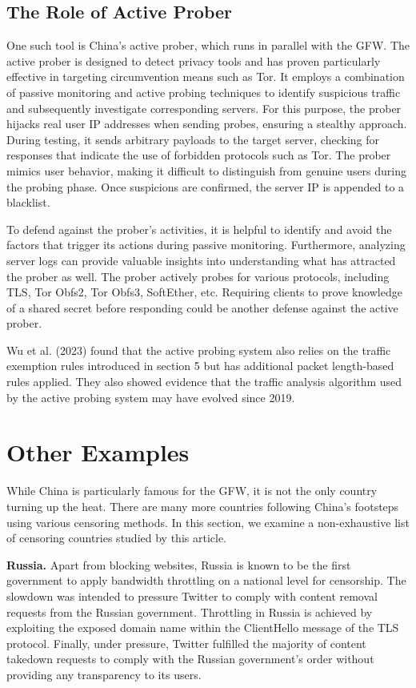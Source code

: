 \subsection{The Role of Active Prober}
One such tool is China's active prober, which runs in parallel with the GFW. The active prober is designed to detect privacy tools and has proven particularly effective in targeting circumvention means such as Tor. It employs a combination of passive monitoring and active probing techniques to identify suspicious traffic and subsequently investigate corresponding servers. For this purpose, the prober hijacks real user IP addresses when sending probes, ensuring a stealthy approach. During testing, it sends arbitrary payloads to the target server, checking for responses that indicate the use of forbidden protocols such as Tor. The prober mimics user behavior, making it difficult to distinguish from genuine users during the probing phase. Once suspicions are confirmed, the server IP is appended to a blacklist.\cite{ensafi2015firewall}

To defend against the prober's activities, it is helpful to identify and avoid the factors that trigger its actions during passive monitoring. Furthermore, analyzing server logs can provide valuable insights into understanding what has attracted the prober as well. The prober actively probes for various protocols, including TLS, Tor Obfs2, Tor Obfs3, SoftEther, etc. Requiring clients to prove knowledge of a shared secret before responding could be another defense against the active prober.\cite{ensafi2015firewall}

Wu et al. (2023) found that the active probing system also relies on the traffic exemption rules introduced in section 5 but has additional packet length-based rules applied. They also showed evidence that the traffic analysis algorithm used by the active probing system may have evolved since 2019.\cite{wu2023great}
 
\section{Other Examples}
While China is particularly famous for the GFW, it is not the only country turning up the heat. There are many more countries following China's footsteps using various censoring methods. In this section, we examine a non-exhaustive list of censoring countries studied by this article.

\textbf{Russia.} Apart from blocking websites, Russia is known to be the first government to apply bandwidth throttling on a national level for censorship. The slowdown was intended to pressure Twitter to comply with content removal requests from the Russian government. Throttling in Russia is achieved by exploiting the exposed domain name within the ClientHello message of the TLS protocol. Finally, under pressure, Twitter fulfilled the majority of content takedown requests to comply with the Russian government’s order without providing any transparency to its users.\cite{xue2021throttling}\cite{chai2019importance}

